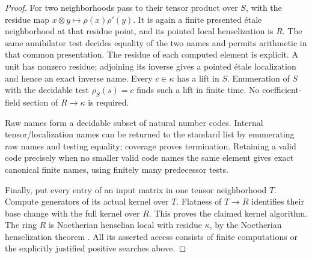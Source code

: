 \begin{proof}
For two neighborhoods pass to their tensor
product over $S$, with the residue map
$x\otimes y\mapsto\rho(x)\rho'(y)$.
It is again a finite presented \'etale
neighborhood at that residue point, and its
pointed local henselization is $R$.
The same annihilator test decides equality
of the two names and permits arithmetic in
that common presentation.  The residue of
each computed element is explicit.
A unit has nonzero residue; adjoining its
inverse gives a pointed \'etale localization
and hence an exact inverse name.
Every $c\in\kappa$ has a lift in $S$.
Enumeration of $S$ with the decidable test
$\rho_S(s)=c$ finds such a lift in finite time.
No coefficient-field section of $R\to\kappa$
is required.

Raw names form a decidable subset of natural
number codes.  Internal tensor/localization
names can be returned to the standard list
by enumerating raw names and testing equality;
coverage proves termination.  Retaining a
valid code precisely when no smaller valid
code names the same element gives exact
canonical finite names, using finitely many
predecessor tests.

Finally, put every entry of an input matrix
in one tensor neighborhood $T$.
Compute generators of its actual kernel over
$T$.  Flatness of $T\to R$ identifies their
base change with the full kernel over $R$.
This proves the claimed kernel algorithm.
The ring $R$ is Noetherian henselian local
with residue $\kappa$, by the Noetherian
henselization theorem
\cite[Lemma 15.46.3, Tag 06LJ]{C-StacksHenselianEffective}.
All its asserted access consists of finite
computations or the explicitly justified
positive searches above.
\end{proof}

